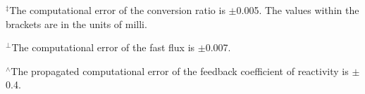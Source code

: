 \begin{landscape}
\begin{table}[ht!]
\begin{threeparttable}[t]
			\rule{0in}{1.2em}$^\ddagger$\scriptsize The computational error of the conversion ratio is $\pm$0.005. The values within the brackets are in the units of milli.

			\rule{0in}{1.2em}$^\perp$\scriptsize The computational error of the fast flux is $\pm$0.007.

			\rule{0in}{1.2em}$^\wedge$\scriptsize The propagated computational error of the feedback coefficient of reactivity is $\pm$0.4.

		\end{threeparttable}
		\label{table:optimaldesigns}
	\end{table}

\end{landscape}

